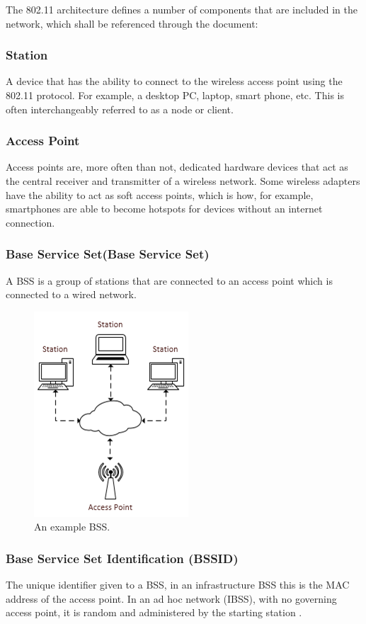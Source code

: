 The 802.11 architecture defines a number of components that are included in the network, which shall be referenced through the document:

\subsubsection*{Station}
A device that has the ability to connect to the wireless access point using the 802.11 protocol. For example, a desktop PC, laptop, smart phone, etc. This is often interchangeably referred to as a node or client.

\subsubsection*{Access Point}
Access points are, more often than not, dedicated hardware devices that act as the central receiver and transmitter of a wireless network. Some wireless adapters have the ability to act as soft access points, which is how, for example, smartphones are able to become hotspots for devices without an internet connection.

\subsubsection*{Base Service Set(Base Service Set)}
A BSS is a group of stations that are connected to an access point which is connected to a wired network.

\begin{figure}[htb!]

\centering\includegraphics{intro/diagrams/bss.png}
\caption{An example BSS.}

\end{figure}

\subsubsection*{Base Service Set Identification (BSSID)}
The unique identifier given to a BSS, in an infrastructure BSS this is the MAC address of the access point. In an ad hoc network (IBSS), with no governing access point, it is random and administered by the starting station \cite{intro:ieee_tutorial}.

